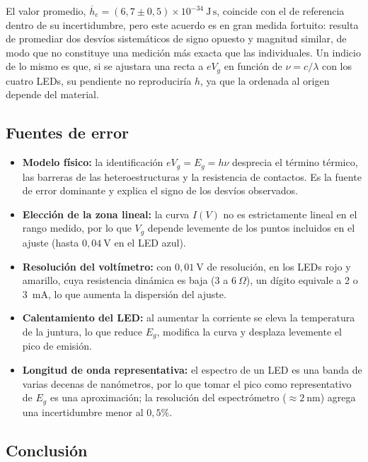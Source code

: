 \documentclass{article}
\newcommand{\Js}{\ \mathrm{J\,s}}
\begin{document}
El valor promedio, $\overline{h}_e=(6,7\pm0,5)\times10^{-34}\Js$, coincide con el de referencia dentro de su incertidumbre, pero este acuerdo es en gran medida fortuito: resulta de promediar dos desvíos sistemáticos de signo opuesto y magnitud similar, de modo que no constituye una medición más exacta que las individuales. Un indicio de lo mismo es que, si se ajustara una recta a $eV_g$ en función de $\nu=c/\lambda$ con los cuatro LEDs, su pendiente no reproduciría $h$, ya que la ordenada al origen depende del material.

\subsection{Fuentes de error}

\begin{itemize}
    \item \textbf{Modelo físico:} la identificación $eV_g=E_g=h\nu$ desprecia el término térmico, las barreras de las heteroestructuras y la resistencia de contactos. Es la fuente de error dominante y explica el signo de los desvíos observados.
    \item \textbf{Elección de la zona lineal:} la curva $I(V)$ no es estrictamente lineal en el rango medido, por lo que $V_g$ depende levemente de los puntos incluidos en el ajuste (hasta $0,04\ \mathrm{V}$ en el LED azul).
    \item \textbf{Resolución del voltímetro:} con $0,01\ \mathrm{V}$ de resolución, en los LEDs rojo y amarillo, cuya resistencia dinámica es baja ($3$ a $6\ \Omega$), un dígito equivale a 2 o 3~mA, lo que aumenta la dispersión del ajuste.
    \item \textbf{Calentamiento del LED:} al aumentar la corriente se eleva la temperatura de la juntura, lo que reduce $E_g$, modifica la curva y desplaza levemente el pico de emisión.
    \item \textbf{Longitud de onda representativa:} el espectro de un LED es una banda de varias decenas de nanómetros, por lo que tomar el pico como representativo de $E_g$ es una aproximación; la resolución del espectrómetro ($\approx2\ \mathrm{nm}$) agrega una incertidumbre menor al $0,5\%$.
\end{itemize}

\subsection{Conclusión}
\end{document}
